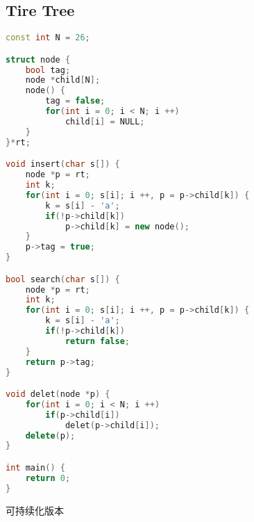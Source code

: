 \subsection{Tire Tree}
    \begin{lstlisting}[language=c++]
const int N = 26;

struct node {
    bool tag;
    node *child[N];
    node() {
        tag = false;
        for(int i = 0; i < N; i ++)
            child[i] = NULL;
    }
}*rt;

void insert(char s[]) {
    node *p = rt;
    int k;
    for(int i = 0; s[i]; i ++, p = p->child[k]) {
        k = s[i] - 'a';
        if(!p->child[k])
            p->child[k] = new node();
    }
    p->tag = true;
}

bool search(char s[]) {
    node *p = rt;
    int k;
    for(int i = 0; s[i]; i ++, p = p->child[k]) {
        k = s[i] - 'a';
        if(!p->child[k])
            return false;
    }
    return p->tag;
}

void delet(node *p) {
    for(int i = 0; i < N; i ++) 
        if(p->child[i])
            delet(p->child[i]);
    delete(p);
}

int main() {
    return 0;
}
    \end{lstlisting}
可持续化版本
